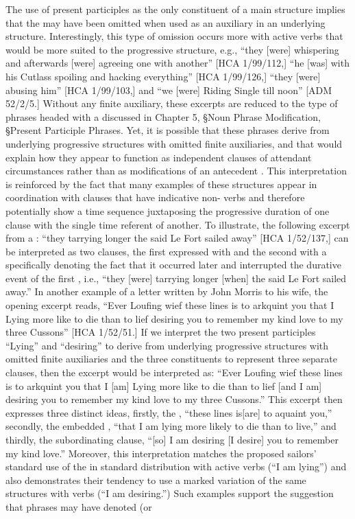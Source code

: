 The use of present participles as the only constituent of a main  structure implies that the  may have been omitted when used as an auxiliary in an underlying  structure. Interestingly, this type of omission occurs more with active verbs that would be more suited to the progressive  structure, e.g., “they [were] whispering and afterwards [were] agreeing one with another” [HCA 1/99/112,] “he [was] with his Cutlass spoiling and hacking everything” [HCA 1/99/126,] “they [were] abusing him” [HCA 1/99/103,] and “we [were] Riding Single till noon” [ADM 52/2/5.] Without any finite auxiliary, these excerpts are reduced to the type of phrases headed with a  discussed in Chapter 5, §Noun Phrase Modification, §Present Participle Phrases. Yet, it is possible that these phrases derive from underlying progressive  structures with omitted finite auxiliaries, and that would explain how they appear to function as independent clauses of attendant circumstances rather than as modifications of an antecedent . This interpretation is reinforced by the fact that many examples of these structures appear in coordination with clauses that have indicative non- verbs and therefore potentially show a time sequence juxtaposing the progressive duration of one clause with the single time referent of another. To illustrate, the following excerpt from a : “they tarrying longer the said Le Fort sailed away” [HCA 1/52/137,] can be interpreted as two clauses, the first expressed with  and the second with a   specifically denoting the fact that it occurred later and interrupted the durative event of the first , i.e., “they [were] tarrying longer [when] the said Le Fort sailed away.”  In another example of a letter written by  John Morris to his wife, the opening excerpt reads, “Ever Loufing wief these lines is to arkquint you that I Lying more like to die than to lief desiring you to remember my kind love to my three Cussons” [HCA 1/52/51.] If we interpret the two present participles “Lying” and “desiring” to derive from underlying progressive  structures with omitted finite auxiliaries and the three  constituents to represent three separate clauses, then the excerpt would be interpreted as: “Ever Loufing wief these lines is to arkquint you that I [am] Lying more like to die than to lief [and I am] desiring you to remember my kind love to my three Cussons.” This excerpt then expresses three distinct ideas, firstly, the , “these lines is[are] to aquaint you,” secondly, the embedded , “that I am lying more likely to die than to live,” and thirdly, the subordinating clause, “[so] I am desiring [I desire] you to remember my kind love.”  Moreover, this interpretation matches the proposed sailors’ standard use of the  in standard distribution with active verbs (“I am lying”) and also demonstrates their tendency to use a marked variation of the same structures with  verbs (“I am desiring.”) Such examples support the suggestion that  phrases may have denoted (or 